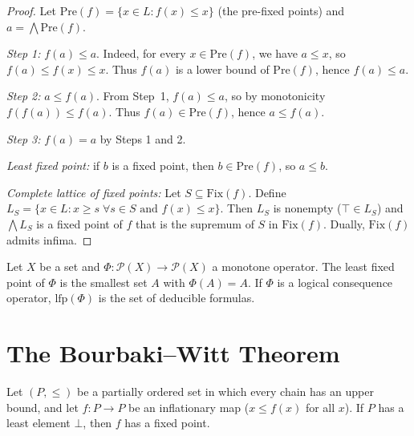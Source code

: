 \begin{proof}
Let $\mathrm{Pre}(f) = \{x \in L : f(x) \leq x\}$ (the pre-fixed points) and
$a = \bigwedge \mathrm{Pre}(f)$.

\emph{Step 1:} $f(a) \leq a$. Indeed, for every $x \in \mathrm{Pre}(f)$, we have
$a \leq x$, so $f(a) \leq f(x) \leq x$. Thus $f(a)$ is a lower bound of
$\mathrm{Pre}(f)$, hence $f(a) \leq a$.

\emph{Step 2:} $a \leq f(a)$. From Step~1, $f(a) \leq a$, so by monotonicity
$f(f(a)) \leq f(a)$. Thus $f(a) \in \mathrm{Pre}(f)$, hence $a \leq f(a)$.

\emph{Step 3:} $f(a) = a$ by Steps 1 and 2.

\emph{Least fixed point:} if $b$ is a fixed point, then $b \in \mathrm{Pre}(f)$, so
$a \leq b$.

\emph{Complete lattice of fixed points:} Let $S \subseteq \mathrm{Fix}(f)$. Define
$L_S = \{x \in L : x \geq s \; \forall s \in S \text{ and } f(x) \leq x\}$. Then $L_S$
is nonempty ($\top \in L_S$) and $\bigwedge L_S$ is a fixed point of $f$ that is the
supremum of $S$ in $\mathrm{Fix}(f)$. Dually, $\mathrm{Fix}(f)$ admits infima.
\end{proof}

\begin{example}
Let $X$ be a set and $\Phi\colon \mathcal{P}(X) \to \mathcal{P}(X)$ a monotone operator.
The least fixed point of $\Phi$ is the smallest set $A$ with $\Phi(A) = A$. If $\Phi$ is
a logical consequence operator, $\mathrm{lfp}(\Phi)$ is the set of deducible formulas.
\end{example}

\section{The Bourbaki--Witt Theorem}

\begin{theorem}
\label{thm:bourbaki-witt}
Let $(P, \leq)$ be a partially ordered set in which every chain has an upper bound, and
let $f\colon P \to P$ be an inflationary map ($x \leq f(x)$ for all $x$). If $P$ has a
least element $\bot$, then $f$ has a fixed point.
\end{theorem}

